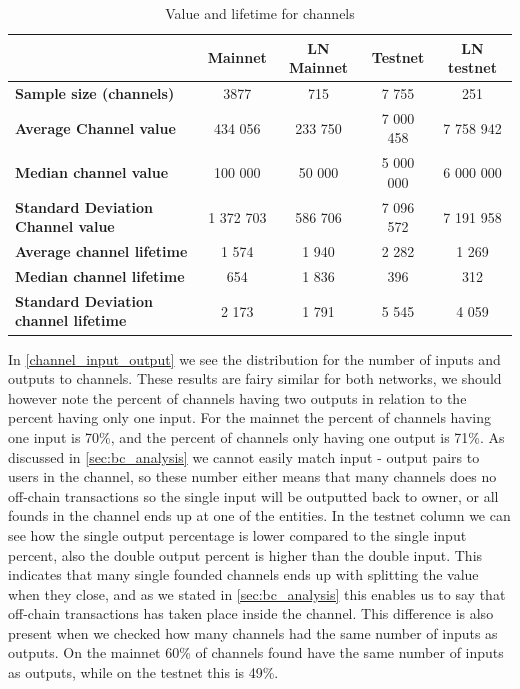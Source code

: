 \begin{table}[ht]
\centering
\caption{Value and lifetime for channels}
\label{subgraph_stats}
\begin{tabular}{|l|c|c|c|c|}
\hline
                                             & \textbf{Mainnet} & \textbf{LN Mainnet}& \textbf{Testnet} & \textbf{LN testnet} \\ \hline
\textbf{Sample size (channels)}              & 3877             & 715           & 7 755               & 251            \\ \hline
\textbf{Average Channel value}               & 434 056          & 233 750         & 7 000 458            &7 758 942       \\ \hline
\textbf{Median channel value}                & 100 000          & 50 000         & 5 000 000            & 6 000 000        \\ \hline
\textbf{Standard Deviation Channel value}    & 1 372 703        & 586 706       & 7 096 572            & 7 191 958        \\ \hline
\textbf{Average channel lifetime}            & 1 574            & 1 940           & 2 282                & 1 269            \\ \hline
\textbf{Median channel lifetime}             & 654              & 1 836             & 396                  & 312              \\ \hline
\textbf{Standard Deviation channel lifetime} & 2 173            & 1 791           & 5 545                & 4 059            \\ \hline
\end{tabular}
\end{table}

In \cref{channel_input_output} we see the distribution for the number of inputs and outputs to channels. These results are fairy similar for both networks, we should however note the percent of channels having two outputs in relation to the percent having only one input. For the mainnet the percent of channels having one input is 70\%, and the percent of channels only having one output is 71\%. As discussed in \cref{sec:bc_analysis} we cannot easily match input - output pairs to users in the channel, so these number either means that many channels does no off-chain transactions so the single input will be outputted back to owner, or all founds in the channel ends up at one of the entities. In the testnet column we can see how the single output percentage is lower compared to the single input percent, also the double output percent is higher than the double input. This indicates that many single founded channels ends up with splitting the value when they close, and as we stated in \cref{sec:bc_analysis} this enables us to say that off-chain transactions has taken place inside the channel.
This difference is also present when we checked how many channels had the same number of inputs as outputs. On the mainnet 60\% of channels found have the same number of inputs as outputs, while on the testnet this is 49\%. 
\\


